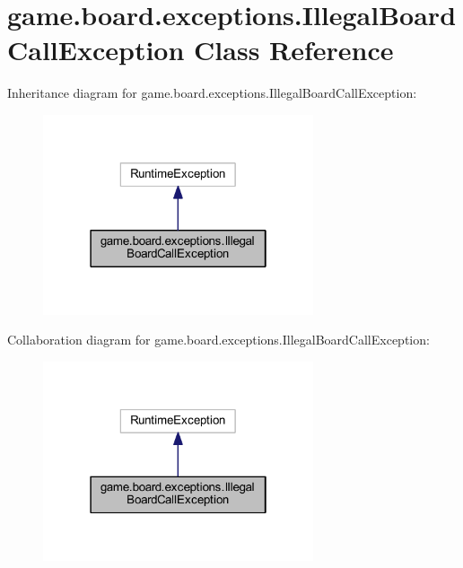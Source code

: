 \hypertarget{classgame_1_1board_1_1exceptions_1_1_illegal_board_call_exception}{}\section{game.\+board.\+exceptions.\+Illegal\+Board\+Call\+Exception Class Reference}
\label{classgame_1_1board_1_1exceptions_1_1_illegal_board_call_exception}


Inheritance diagram for game.\+board.\+exceptions.\+Illegal\+Board\+Call\+Exception\+:
\nopagebreak
\begin{figure}[H]
\begin{center}
\leavevmode
\includegraphics[width=226pt]{classgame_1_1board_1_1exceptions_1_1_illegal_board_call_exception__inherit__graph}
\end{center}
\end{figure}


Collaboration diagram for game.\+board.\+exceptions.\+Illegal\+Board\+Call\+Exception\+:
\nopagebreak
\begin{figure}[H]
\begin{center}
\leavevmode
\includegraphics[width=226pt]{classgame_1_1board_1_1exceptions_1_1_illegal_board_call_exception__coll__graph}
\end{center}
\end{figure}
